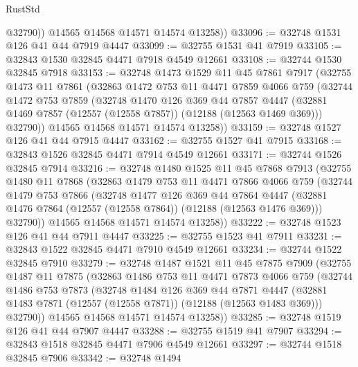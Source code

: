 \begin{lexlean}{RustStd}
\begin{coremodule}
            @32790))
        @14565
        @14568
        @14571
        @14574
        @13258))
@33096 := @32748 @1531 @126 @41 @44 @7919 @4447
@33099 := @32755 @1531 @41 @7919
@33105 := @32843 @1530 @32845 @4471 @7918 @4549 @12661
@33108 := @32744 @1530 @32845 @7918
@33153 := @32748
    @1473
    @1529
    @11
    @45
    @7861
    @7917
    (@32755
      @1473
      @11
      @7861
      (@32863
        @1472
        @753
        @11
        @4471
        @7859
        @4066
        @759
        (@32744
          @1472
          @753
          @7859
          (@32748
            @1470
            @126
            @369
            @44
            @7857
            @4447
            (@32881 @1469 @7857 (@12557 (@12558 @7857)) (@12188 (@12563 @1469 @369)))
            @32790))
        @14565
        @14568
        @14571
        @14574
        @13258))
@33159 := @32748 @1527 @126 @41 @44 @7915 @4447
@33162 := @32755 @1527 @41 @7915
@33168 := @32843 @1526 @32845 @4471 @7914 @4549 @12661
@33171 := @32744 @1526 @32845 @7914
@33216 := @32748
    @1480
    @1525
    @11
    @45
    @7868
    @7913
    (@32755
      @1480
      @11
      @7868
      (@32863
        @1479
        @753
        @11
        @4471
        @7866
        @4066
        @759
        (@32744
          @1479
          @753
          @7866
          (@32748
            @1477
            @126
            @369
            @44
            @7864
            @4447
            (@32881 @1476 @7864 (@12557 (@12558 @7864)) (@12188 (@12563 @1476 @369)))
            @32790))
        @14565
        @14568
        @14571
        @14574
        @13258))
@33222 := @32748 @1523 @126 @41 @44 @7911 @4447
@33225 := @32755 @1523 @41 @7911
@33231 := @32843 @1522 @32845 @4471 @7910 @4549 @12661
@33234 := @32744 @1522 @32845 @7910
@33279 := @32748
    @1487
    @1521
    @11
    @45
    @7875
    @7909
    (@32755
      @1487
      @11
      @7875
      (@32863
        @1486
        @753
        @11
        @4471
        @7873
        @4066
        @759
        (@32744
          @1486
          @753
          @7873
          (@32748
            @1484
            @126
            @369
            @44
            @7871
            @4447
            (@32881 @1483 @7871 (@12557 (@12558 @7871)) (@12188 (@12563 @1483 @369)))
            @32790))
        @14565
        @14568
        @14571
        @14574
        @13258))
@33285 := @32748 @1519 @126 @41 @44 @7907 @4447
@33288 := @32755 @1519 @41 @7907
@33294 := @32843 @1518 @32845 @4471 @7906 @4549 @12661
@33297 := @32744 @1518 @32845 @7906
@33342 := @32748
    @1494

\end{coremodule}
\end{lexlean}
